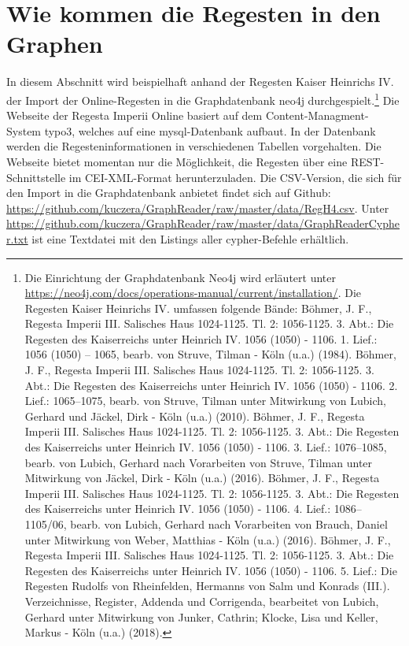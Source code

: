 \documentclass[ngerman,]{scrreprt}
\begin{document}
\hypertarget{wie-kommen-die-regesten-in-den-graphen}{%
\section{Wie kommen die Regesten in den Graphen}\label{wie-kommen-die-regesten-in-den-graphen}}

In diesem Abschnitt wird beispielhaft anhand der Regesten Kaiser Heinrichs IV. der Import der Online-Regesten in die Graphdatenbank neo4j durchgespielt.\footnote{Die Einrichtung der Graphdatenbank Neo4j wird erläutert unter \url{https://neo4j.com/docs/operations-manual/current/installation/}. Die Regesten Kaiser Heinrichs IV. umfassen folgende Bände: Böhmer, J. F., Regesta Imperii III. Salisches Haus 1024-1125. Tl. 2: 1056-1125. 3. Abt.: Die Regesten des Kaiserreichs unter Heinrich IV. 1056 (1050) - 1106. 1. Lief.: 1056 (1050) -- 1065, bearb. von Struve, Tilman - Köln (u.a.) (1984). Böhmer, J. F., Regesta Imperii III. Salisches Haus 1024-1125. Tl. 2: 1056-1125. 3. Abt.: Die Regesten des Kaiserreichs unter Heinrich IV. 1056 (1050) - 1106. 2. Lief.: 1065--1075, bearb. von Struve, Tilman unter Mitwirkung von Lubich, Gerhard und Jäckel, Dirk - Köln (u.a.) (2010). Böhmer, J. F., Regesta Imperii III. Salisches Haus 1024-1125. Tl. 2: 1056-1125. 3. Abt.: Die Regesten des Kaiserreichs unter Heinrich IV. 1056 (1050) - 1106. 3. Lief.: 1076--1085, bearb. von Lubich, Gerhard nach Vorarbeiten von Struve, Tilman unter Mitwirkung von Jäckel, Dirk - Köln (u.a.) (2016). Böhmer, J. F., Regesta Imperii III. Salisches Haus 1024-1125. Tl. 2: 1056-1125. 3. Abt.: Die Regesten des Kaiserreichs unter Heinrich IV. 1056 (1050) - 1106. 4. Lief.: 1086--1105/06, bearb. von Lubich, Gerhard nach Vorarbeiten von Brauch, Daniel unter Mitwirkung von Weber, Matthias - Köln (u.a.) (2016). Böhmer, J. F., Regesta Imperii III. Salisches Haus 1024-1125. Tl. 2: 1056-1125. 3. Abt.: Die Regesten des Kaiserreichs unter Heinrich IV. 1056 (1050) - 1106. 5. Lief.: Die Regesten Rudolfs von Rheinfelden, Hermanns von Salm und Konrads (III.). Verzeichnisse, Register, Addenda und Corrigenda, bearbeitet von Lubich, Gerhard unter Mitwirkung von Junker, Cathrin; Klocke, Lisa und Keller, Markus - Köln (u.a.) (2018).} Die Webseite der Regesta Imperii Online basiert auf dem Content-Managment-System typo3, welches auf eine mysql-Datenbank aufbaut. In der Datenbank werden die Regesteninformationen in verschiedenen Tabellen vorgehalten. Die Webseite bietet momentan nur die Möglichkeit, die Regesten über eine REST-Schnittstelle im CEI-XML-Format herunterzuladen. Die CSV-Version, die sich für den Import in die Graphdatenbank anbietet findet sich auf Github: \url{https://github.com/kuczera/GraphReader/raw/master/data/RegH4.csv}. Unter \url{https://github.com/kuczera/GraphReader/raw/master/data/GraphReaderCypher.txt} ist eine Textdatei mit den Listings aller cypher-Befehle erhältlich.
\end{document}
